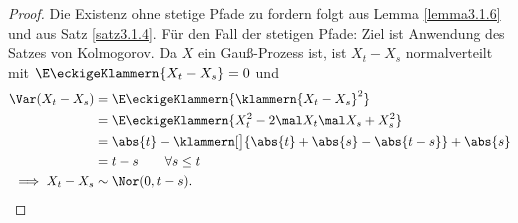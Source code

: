 \begin{proof}
	Die Existenz ohne stetige Pfade zu fordern folgt aus Lemma \ref{lemma3.1.6} und aus Satz \ref{satz3.1.4}.
	Für den Fall der stetigen Pfade:
	Ziel ist Anwendung des Satzes von Kolmogorov. %
	Da $X$ ein Gauß-Prozess ist, ist $X_t-X_s$ normalverteilt mit $\E\eckigeKlammern{X_t-X_s}=0$ und 
	\begin{align*}
		\Var(X_t-X_s)
		&=\E\eckigeKlammern{\klammern{X_t-X_s}^2}\\
		&=\E\eckigeKlammern{X_t^2-2\mal X_t\mal X_s+X_s^2}\\
		&=\abs{t}-\klammern[\big]{\abs{t}+\abs{s}-\abs{t-s}}+\abs{s}\\
		&=t-s
		\qquad\forall s\leq t\\
		\implies X_t-X_s&\sim\Nor(0,t-s).
	\end{align*}
\end{proof}
